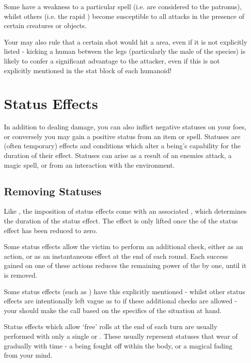 Some have a weakness to a particular spell (i.e.  are considered  to the patronus), whilst others (i.e. the rapid ) become susceptible to all attacks in the presence of certain creatures or objects. 

Your  may also rule that a certain  shot would hit a  area, even if it is not explicitly listed - kicking a human between the legs (particularly the male of the species) is likely to confer a significant advantage to the attacker, even if this is not explicitly mentioned in the stat block of each humanoid!


\chapter{Status Effects}\label{S:Statuses}

In addition to dealing damage, you can also inflict negative statuses on your foes, or conversely you may gain a positive status from an item or spell. Statuses are (often temporary) effects and conditions which alter a being's capability for the duration of their effect. Statuses can arise as a result of an enemies attack, a magic spell, or from an interaction with the environment. 


\section{Removing Statuses}
Like , the imposition of status effects come with an associated , which determines the duration of the status effect. The effect is only lifted once the  of the status effect has been reduced to zero. 

Some status effects allow the victim to perform an additional check, either as an action, or as an instantaneous effect at the end of each round. Each success gained on one of these actions reduces the remaining power of the  by one, until it is removed. 

Some status effects (such as ) have this explicitly mentioned - whilst other status effects are intentionally left vague as to if these additional checks are allowed - your  should make the call based on the specifics of the situation at hand. 

Status effects which allow `free' rolls at the end of each turn are usually performed with only a single  or . These usually represent statuses that wear of gradually with time - a  being fought off within the body, or a magical  fading from your mind. 

